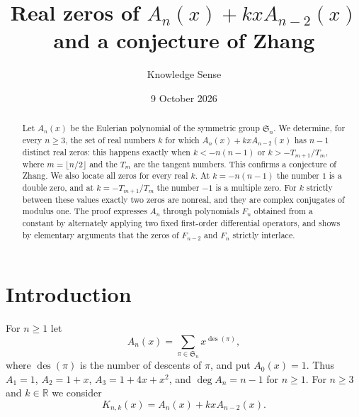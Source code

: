 \documentclass{amsart}
\theoremstyle{remark}
\numberwithin{equation}{section}
\DeclareMathOperator{\des}{des}
\newcommand{\RR}{\mathbb{R}}
\newcommand{\fS}{\mathfrak{S}}
\begin{document}
\title[Real zeros of $A_n(x)+kxA_{n-2}(x)$]{Real zeros of $A_n(x)+kxA_{n-2}(x)$ and a conjecture of Zhang}

\author{Knowledge Sense}
\address{Knowledge Sense}

\date{9 October 2026}



\begin{abstract}
Let $A_n(x)$ be the Eulerian polynomial of the symmetric group $\fS_n$. We
determine, for every $n\ge 3$, the set of real numbers $k$ for which
$A_n(x)+kxA_{n-2}(x)$ has $n-1$ distinct real zeros: this happens exactly
when $k<-n(n-1)$ or $k>-T_{m+1}/T_m$, where $m=\lfloor n/2\rfloor$ and the
$T_m$ are the tangent numbers. This confirms a conjecture of Zhang. We also
locate all zeros for every real $k$. At $k=-n(n-1)$ the number $1$ is a
double zero, and at $k=-T_{m+1}/T_m$ the number $-1$ is a multiple zero. For
$k$ strictly between these values exactly two zeros are nonreal, and they are
complex conjugates of modulus one. The proof expresses $A_n$ through
polynomials $F_n$ obtained from a constant by alternately applying two fixed
first-order differential operators, and shows by elementary arguments that
the zeros of $F_{n-2}$ and $F_n$ strictly interlace.
\end{abstract}

\maketitle

\section{Introduction}

For $n\ge 1$ let
\[
A_n(x)=\sum_{\pi\in\fS_n}x^{\des(\pi)},
\]
where $\des(\pi)$ is the number of descents of $\pi$, and put $A_0(x)=1$.
Thus $A_1=1$, $A_2=1+x$, $A_3=1+4x+x^2$, and $\deg A_n=n-1$ for $n\ge 1$. For
$n\ge 3$ and $k\in\RR$ we consider
\begin{equation}\label{eq:K}
K_{n,k}(x)=A_n(x)+kxA_{n-2}(x).
\end{equation}
\end{document}

